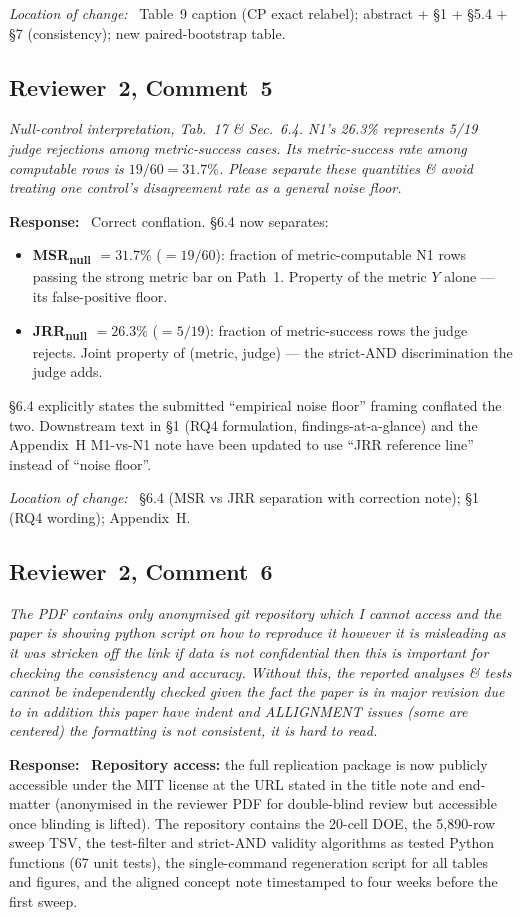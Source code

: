 \documentclass[11pt,a4paper]{article}
\newenvironment{reviewerquote}
  {\begin{tcolorbox}[colback=black!5, colframe=black!15, boxrule=0.3pt,
                     arc=1pt, left=6pt, right=6pt, top=3pt, bottom=3pt,
                     breakable]\itshape\small}
  {\end{tcolorbox}}
\newcommand{\rcomment}[2]{\subsection*{Reviewer~#1, Comment~#2}}
\newcommand{\response}{\noindent\textbf{Response:}\ }
\newcommand{\loc}{\par\smallskip\noindent\textit{Location of change:}\ }
\begin{document}
\loc{} Table~9 caption (CP exact relabel); abstract + \S1 + \S5.4 + \S7 (consistency); new paired-bootstrap table.

\rcomment{2}{5}

\begin{reviewerquote}
Null-control interpretation, Tab.\ 17 \& Sec.\ 6.4. N1's 26.3\% represents 5/19 judge rejections among metric-success cases. Its metric-success rate among computable rows is $19/60 = 31.7\%$. Please separate these quantities \& avoid treating one control's disagreement rate as a general noise floor.
\end{reviewerquote}

\response{}
Correct conflation. \S6.4 now separates:
\begin{itemize}
  \item \textbf{MSR\textsubscript{null} $= 31.7\%$} ($= 19/60$): fraction of metric-computable N1 rows passing the strong metric bar on Path~1. Property of the metric $Y$ alone --- its false-positive floor.
  \item \textbf{JRR\textsubscript{null} $= 26.3\%$} ($= 5/19$): fraction of metric-success rows the judge rejects. Joint property of (metric, judge) --- the strict-AND discrimination the judge adds.
\end{itemize}
\S6.4 explicitly states the submitted ``empirical noise floor'' framing conflated the two. Downstream text in \S1 (RQ4 formulation, findings-at-a-glance) and the Appendix~H M1-vs-N1 note have been updated to use ``JRR reference line'' instead of ``noise floor''.

\loc{} \S6.4 (MSR vs JRR separation with correction note); \S1 (RQ4 wording); Appendix~H.

\rcomment{2}{6}

\begin{reviewerquote}
The PDF contains only anonymised git repository which I cannot access and the paper is showing python script on how to reproduce it however it is misleading as it was stricken off the link if data is not confidential then this is important for checking the consistency and accuracy. Without this, the reported analyses \& tests cannot be independently checked given the fact the paper is in major revision due to in addition this paper have indent and ALLIGNMENT issues (some are centered) the formatting is not consistent, it is hard to read.
\end{reviewerquote}

\response{}
\textbf{Repository access:} the full replication package is now publicly accessible under the MIT license at the URL stated in the title note and end-matter (anonymised in the reviewer PDF for double-blind review but accessible once blinding is lifted). The repository contains the 20-cell DOE, the 5{,}890-row sweep TSV, the test-filter and strict-AND validity algorithms as tested Python functions (67 unit tests), the single-command regeneration script for all tables and figures, and the aligned concept note timestamped to four weeks before the first sweep.
\end{document}
